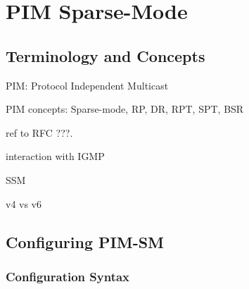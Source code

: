 \chapter{PIM Sparse-Mode}
\label{pimsm}

\section{Terminology and Concepts}

PIM: Protocol Independent Multicast

PIM concepts: Sparse-mode, RP, DR, RPT, SPT, BSR

ref to RFC ???.

interaction with IGMP

SSM

v4 vs v6

\section{Configuring PIM-SM}
\subsection{Configuration Syntax}

